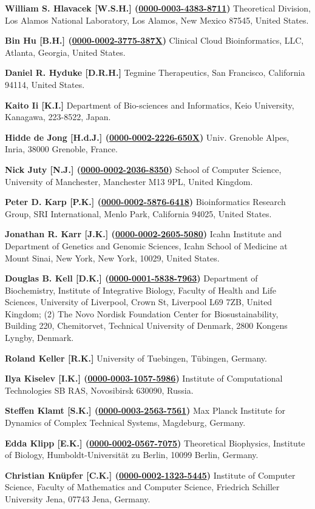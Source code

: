 \documentclass{sbml-paper}
\newcommand{\orcid}[1]{\href{https://orcid.org/#1}{#1}}
\begin{document}
\textbf{William S. Hlavacek [W.S.H.] (\orcid{0000-0003-4383-8711})} Theoretical Division, Los Alamos National Laboratory, Los Alamos, New Mexico 87545, United States.

\textbf{Bin Hu [B.H.] (\orcid{0000-0002-3775-387X})} Clinical Cloud Bioinformatics, LLC, Atlanta, Georgia, United States.

\textbf{Daniel R. Hyduke [D.R.H.]} Tegmine Therapeutics, San Francisco, California 94114, United States.

\textbf{Kaito Ii [K.I.]} Department of Bio-sciences and Informatics, Keio University, Kanagawa, 223-8522, Japan.

\textbf{Hidde de Jong [H.d.J.] (\orcid{0000-0002-2226-650X})} Univ. Grenoble Alpes, Inria, 38000 Grenoble, France.

\textbf{Nick Juty [N.J.] (\orcid{0000-0002-2036-8350})} School of Computer Science, University of Manchester, Manchester M13 9PL, United Kingdom.

\textbf{Peter D. Karp [P.K.] (\orcid{0000-0002-5876-6418})} Bioinformatics Research Group, SRI International, Menlo Park, California 94025, United States.

\textbf{Jonathan R. Karr [J.K.] (\orcid{0000-0002-2605-5080})} Icahn Institute and Department of Genetics and Genomic Sciences, Icahn School of Medicine at Mount Sinai, New York, New York, 10029, United States.

\textbf{Douglas B. Kell [D.K.] (\orcid{0000-0001-5838-7963})} Department of Biochemistry, Institute of Integrative Biology, Faculty of Health and Life Sciences, University of Liverpool, Crown St, Liverpool L69 7ZB, United Kingdom; (2) The Novo Nordisk Foundation Center for Biosustainability, Building 220, Chemitorvet, Technical University of Denmark, 2800 Kongens Lyngby, Denmark.

\textbf{Roland Keller [R.K.]} University of Tuebingen, Tübingen, Germany.

\textbf{Ilya Kiselev [I.K.] (\orcid{0000-0003-1057-5986})} Institute of Computational Technologies SB RAS, Novosibirsk 630090, Russia.

\textbf{Steffen Klamt [S.K.] (\orcid{0000-0003-2563-7561})} Max Planck Institute for Dynamics of Complex Technical Systems, Magdeburg, Germany.

\textbf{Edda Klipp [E.K.] (\orcid{0000-0002-0567-7075})} Theoretical Biophysics, Institute of Biology, Humboldt-Universität zu Berlin, 10099 Berlin, Germany.

\textbf{Christian Knüpfer [C.K.] (\orcid{0000-0002-1323-5445})} Institute of Computer Science, Faculty of Mathematics and Computer Science, Friedrich Schiller University Jena, 07743 Jena, Germany.
\end{document}
